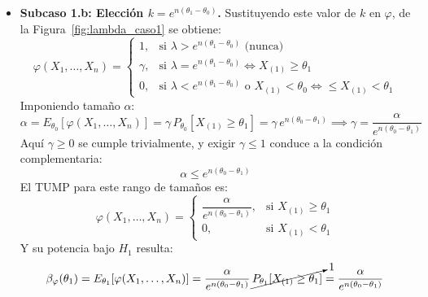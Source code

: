 \begin{ejercicio}
\begin{description}
\begin{itemize}
        \item \textbf{Subcaso 1.b: Elección $k = e^{n(\theta_1 - \theta_0)}$.} Sustituyendo este valor de $k$ en $\varphi$, de la Figura~\ref{fig:lambda_caso1} se obtiene:
        \begin{equation*}
            \varphi(X_1, \dots, X_n) =
            \begin{cases}
                1, & \text{si } \lambda > e^{n(\theta_1 - \theta_0)} \text{ (nunca)} \\
                \gamma, & \text{si } \lambda = e^{n(\theta_1 - \theta_0)} \iff X_{(1)} \ge \theta_1 \\
                0, & \text{si } \lambda < e^{n(\theta_1 - \theta_0)} \text{ o } X_{(1)} < \theta_0 \iff \le X_{(1)} < \theta_1
            \end{cases}
        \end{equation*}
        Imponiendo tamaño $\alpha$:
        \begin{equation*}
            \alpha = E_{\theta_0}[\varphi(X_1, \dots, X_n)] = \gamma \, P_{\theta_0}[X_{(1)} \ge \theta_1] = \gamma \, e^{n(\theta_0 - \theta_1)} \implies \gamma = \frac{\alpha}{e^{n(\theta_0 - \theta_1)}}
        \end{equation*}
        Aquí $\gamma \ge 0$ se cumple trivialmente, y exigir $\gamma \le 1$ conduce a la condición complementaria:
        \begin{equation*}
            \alpha \le e^{n(\theta_0 - \theta_1)}
        \end{equation*}
        El TUMP para este rango de tamaños es:
        \begin{equation*}
            \varphi(X_1, \dots, X_n) =
            \begin{cases}
                \dfrac{\alpha}{e^{n(\theta_0 - \theta_1)}}, & \text{si } X_{(1)} \ge \theta_1 \\
                0, & \text{si } X_{(1)} < \theta_1
            \end{cases}
        \end{equation*}
        Y su potencia bajo $H_1$ resulta:
        \begin{equation*}
            \beta_\varphi(\theta_1) = E_{\theta_1}[\varphi(X_1, \dots, X_n)] = \frac{\alpha}{e^{n(\theta_0 - \theta_1)}} \, \cancelto{1}{P_{\theta_1}[X_{(1)} \ge \theta_1]} = \frac{\alpha}{e^{n(\theta_0 - \theta_1)}}
        \end{equation*}
    \end{itemize}


\end{description}
\end{ejercicio}
